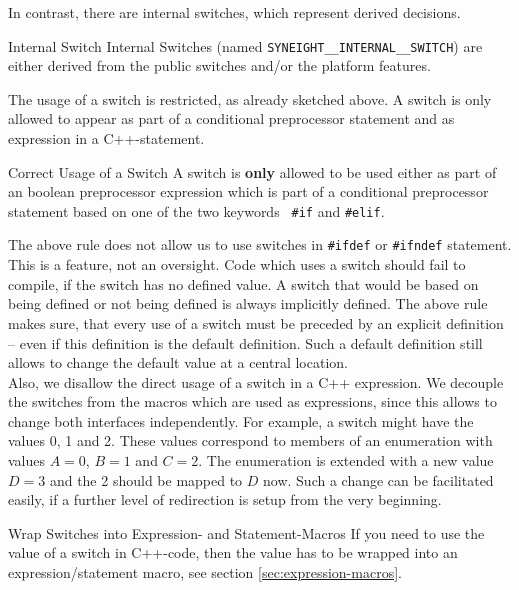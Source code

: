In contrast, there are internal switches, which represent derived
decisions.
\begin{definition*}{Internal Switch}
  Internal Switches (named {\tt SYNEIGHT\_\_INTERNAL\_\_SWITCH}) are
  either derived from the public switches and/or the platform features.
\end{definition*}
%

The usage of a switch is restricted, as already sketched above. A
switch is only allowed to appear as part of a conditional preprocessor
statement and as expression in a C++-statement.
%
\begin{rule*}{Correct Usage of a Switch}
  A switch is \textbf{only} allowed to be used either as part of an
  boolean preprocessor expression which is part of a conditional
  preprocessor statement based on one of the two keywords {\tt
    \#if} and {\tt \#elif}.
\end{rule*}
%
The above rule does not allow us to use switches in {\tt \#ifdef} or
{\tt \#ifndef} statement. This is a feature, not an oversight. Code
which uses a switch should fail to compile, if the switch has no
defined value. A switch that would be based on being defined or not
being defined is always implicitly defined. The above rule makes sure,
that every use of a switch must be preceded by an explicit definition
-- even if this definition is the default definition. Such a default
definition still allows to change the default value at a central
location.\\
%
Also, we disallow the direct usage of a switch in a C++
expression. We decouple the switches from the macros which are used as
expressions, since this allows to change both interfaces
independently. For example, a switch might have the values 0, 1 and
2. These values correspond to members of an enumeration with values
$A=0$, $B=1$ and $C=2$. The enumeration is extended with a new value
$D=3$ and the 2 should be mapped to $D$ now. Such a change can be
facilitated easily, if a further level of redirection is setup from
the very beginning.  
%
\begin{rule*}{Wrap Switches into Expression- and Statement-Macros}
  \label{guide:wrap-switch}
  If you need to use the value of a switch in C++-code, then the value
  has to be wrapped into an expression/statement macro, see section
  \vref{sec:expression-macros}.
\end{rule*}


